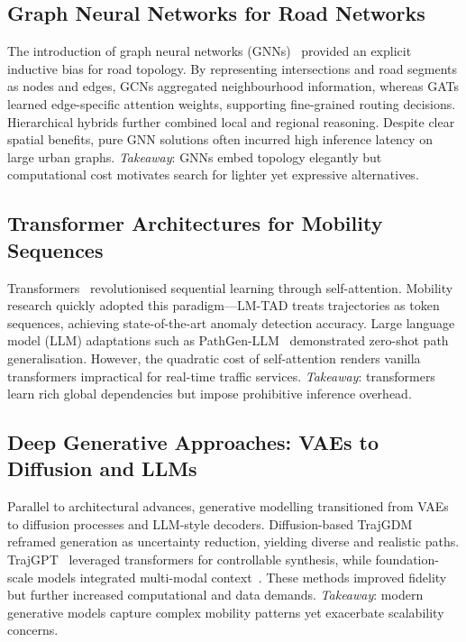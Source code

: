 \subsection{Graph Neural Networks for Road Networks}
\label{sec:lit-gnn}
The introduction of graph neural networks (GNNs)~\cite{kipfSemisupervisedClassificationGraph2017,veličkovićGraphAttentionNetworks2018} provided an explicit inductive bias for road topology.  By representing intersections and road segments as nodes and edges, GCNs aggregated neighbourhood information, whereas GATs learned edge-specific attention weights, supporting fine-grained routing decisions.  Hierarchical hybrids further combined local and regional reasoning.  Despite clear spatial benefits, pure GNN solutions often incurred high inference latency on large urban graphs.  \textit{Takeaway}: GNNs embed topology elegantly but computational cost motivates search for lighter yet expressive alternatives.

\subsection{Transformer Architectures for Mobility Sequences}
\label{sec:lit-transformer}
Transformers~\cite{vaswaniAttentionAllYou2023} revolutionised sequential learning through self-attention.  Mobility research quickly adopted this paradigm—LM-TAD treats trajectories as token sequences, achieving state-of-the-art anomaly detection accuracy.  Large language model (LLM) adaptations such as PathGen-LLM~\cite{liPathGenLLMLargeLanguage} demonstrated zero-shot path generalisation.  However, the quadratic cost of self-attention renders vanilla transformers impractical for real-time traffic services.  \textit{Takeaway}: transformers learn rich global dependencies but impose prohibitive inference overhead.

\subsection{Deep Generative Approaches: VAEs to Diffusion and LLMs}
\label{sec:lit-generative}
Parallel to architectural advances, generative modelling transitioned from VAEs to diffusion processes and LLM-style decoders.  Diffusion-based TrajGDM~\cite{chuSimulatingHumanMobility2024} reframed generation as uncertainty reduction, yielding diverse and realistic paths.  TrajGPT~\cite{hsuTrajGPTControlledSynthetic2024} leveraged transformers for controllable synthesis, while foundation-scale models integrated multi-modal context~\cite{maLearningUniversalHuman2025}.  These methods improved fidelity but further increased computational and data demands.  \textit{Takeaway}: modern generative models capture complex mobility patterns yet exacerbate scalability concerns.

